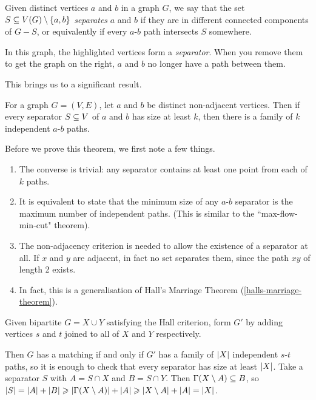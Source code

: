 \documentclass{article}
\begin{document}
\begin{definition}[Separator]
    Given distinct vertices $a$ and $b$ in a graph $G$, we say that the set $S \subseteq V(G) \setminus \left\lbrace a, b \right\rbrace$ \textit{separates} $a$ and $b$ if they are in different connected components of $G - S$, or equivalently if every $a$-$b$ path intersects $S$ somewhere.
    
    
    In this graph, the highlighted vertices form a \textit{separator}. When you remove them to get the graph on the right, $a$ and $b$ no longer have a path between them.
\end{definition}

This brings us to a significant result.

\begin{theorem}
    \label{mengers-theorem}
    For a graph $G = (V, E)$, let $a$ and $b$ be distinct non-adjacent vertices. Then if every separator $S \subseteq V$ of $a$ and $b$ has size at least $k$, then there is a family of $k$ independent $a$-$b$ paths.
\end{theorem}

\begin{remark}
    Before we prove this theorem, we first note a few things.
	\begin{enumerate}
	    \item The converse is trivial: any separator contains at least one point from each of $k$ paths.
	    \item It is equivalent to state that the minimum size of any $a$-$b$ separator is the maximum number of independent paths. (This is similar to the ``max-flow-min-cut" theorem).
	    \item The non-adjacency criterion is needed to allow the existence of a separator at all. If $x$ and $y$ are adjacent, in fact no set separates them, since the path $xy$ of length 2 exists.
	    \item In fact,  this is a generalisation of Hall's Marriage Theorem (\ref{halls-marriage-theorem}).
	\end{enumerate}
\end{remark}

Given bipartite $G = X \cup Y$ satisfying the Hall criterion, form $G'$ by adding vertices $s$ and $t$ joined to all of $X$ and $Y$ respectively.

Then $G$ has a matching if and only if $G'$ has a family of $\left\lvert X \right\rvert$ independent $s$-$t$ paths, so it is enough to check that every separator has size at least $\left\lvert X \right\rvert$. Take a separator $S$ with $A = S \cap X$ and $B = S \cap Y$. Then $\Gamma(X \setminus A) \subseteq B$, so $\left\lvert S \right\rvert = \left\lvert A \right\rvert + \left\lvert B \right\rvert \geqslant \left\lvert \Gamma(X \setminus A) \right\rvert + \left\lvert A \right\rvert \geqslant \left\lvert X \setminus A \right\rvert + \left\lvert A \right\rvert = \left\lvert X \right\rvert$.
\end{document}
